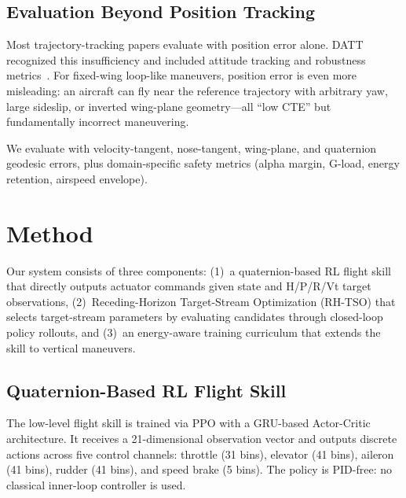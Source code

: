 \documentclass{article}
\begin{document}
\subsection{Evaluation Beyond Position Tracking}

Most trajectory-tracking papers evaluate with position error alone.
DATT recognized this insufficiency and included attitude tracking and robustness metrics~\citep{huang2023datt}.
For fixed-wing loop-like maneuvers, position error is even more misleading: an aircraft can fly near the reference trajectory with arbitrary yaw, large sideslip, or inverted wing-plane geometry---all ``low CTE'' but fundamentally incorrect maneuvering.

We evaluate with velocity-tangent, nose-tangent, wing-plane, and quaternion geodesic errors, plus domain-specific safety metrics (alpha margin, G-load, energy retention, airspeed envelope).


\section{Method}

Our system consists of three components:
(1)~a quaternion-based RL flight skill that directly outputs actuator commands given state and H/P/R/Vt target observations,
(2)~Receding-Horizon Target-Stream Optimization (RH-TSO) that selects target-stream parameters by evaluating candidates through closed-loop policy rollouts, and
(3)~an energy-aware training curriculum that extends the skill to vertical maneuvers.


\subsection{Quaternion-Based RL Flight Skill}

The low-level flight skill is trained via PPO with a GRU-based Actor-Critic architecture.
It receives a 21-dimensional observation vector and outputs discrete actions across five control channels: throttle (31 bins), elevator (41 bins), aileron (41 bins), rudder (41 bins), and speed brake (5 bins).
The policy is PID-free: no classical inner-loop controller is used.
\end{document}
